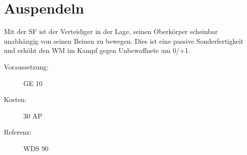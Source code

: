 \section{Auspendeln}
\label{sf.auspendeln}
Mit der SF  ist der Verteidiger in der Lage, seinen Oberkörper scheinbar unabhängig von seinen Beinen zu bewegen.
Dies ist eine passive Sonderfertigkeit und erhöht den WM im Kampf gegen Unbewaffnete um 0/+1.
\begin{description}
    \item[Voraussetzung:]
        GE 10
    \item [Kosten:]
        30 AP
    \item [Referenz:]
        WDS 90
\end{description}
